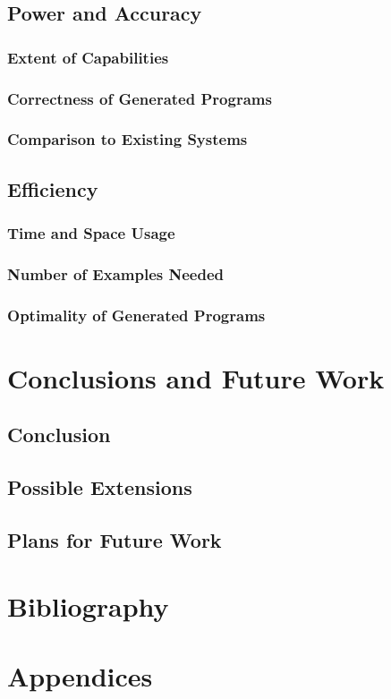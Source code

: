 \documentclass[a4paper,twoside,notitlepage]{article}
\begin{document}
\subsection{Power and Accuracy}
\subsubsection{Extent of Capabilities}
\subsubsection{Correctness of Generated Programs}
\subsubsection{Comparison to Existing Systems}
\subsection{Efficiency}
\subsubsection{Time and Space Usage}
\subsubsection{Number of Examples Needed}
\subsubsection{Optimality of Generated Programs}
\clearpage

\section{Conclusions and Future Work}
\subsection{Conclusion}
\subsection{Possible Extensions}
\subsection{Plans for Future Work}
\clearpage

\section{Bibliography}

\section{Appendices}
\end{document}
